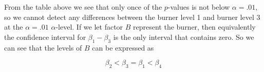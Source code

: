 \documentclass[12pt,]{article}
\begin{document}
From the table above we see that only once of the \(p\)-values is not
below \(\alpha = .01\), so we cannot detect any differences between the
burner level 1 and burner level 3 at the \(\alpha=.01\)
\(\alpha\)-level. If we let factor \(B\) represent the burner, then
equivalently the confidence interval for \(\beta_1 - \beta_3\) is the
only interval that contains zero. So we can see that the levels of \(B\)
can be expressed as

\[
\beta_2 < \beta_3 = \beta_1 < \beta_4
\]
\end{document}
